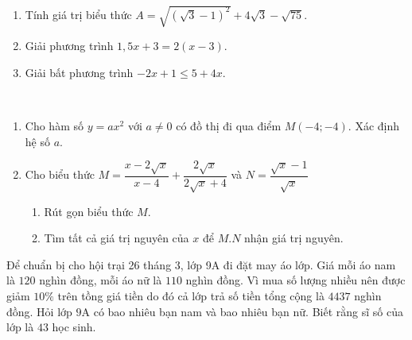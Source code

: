 \setcounter{deso}{2}
\begin{name}
	{\tenchude}
	{\tendethi}
	{\tentruong}
	{\thoigian}
\end{name}
\begin{bt}[1,5 điểm]~
\begin{enumerate}[1.]
    \item Tính giá trị biểu thức $A=\sqrt{(\sqrt{3}-1)^2}+4\sqrt{3}-\sqrt{75}$.
    \item Giải phương trình $1,5x+3=2(x-3)$.
    \item Giải bất phương trình $-2x+1 \le 5+4x$.
\end{enumerate}
\end{bt}

\begin{bt}[2,0 điểm]~
\begin{enumerate}[1.]
    \item Cho hàm số $y=ax^2$ với $a \ne 0$ có đồ thị đi qua điểm $M(-4;-4)$. Xác định hệ số $a$.
    \item Cho biểu thức $M=\dfrac{x-2\sqrt{x}}{x-4}+\dfrac{2\sqrt{x}}{2\sqrt{x}+4}$ và $N=\dfrac{\sqrt{x}-1}{\sqrt{x}}$
    \begin{enumerate}
        \item Rút gọn biểu thức $M$.
        \item Tìm tất cả giá trị nguyên của $x$ để $M.N$ nhận giá trị nguyên.
    \end{enumerate}
\end{enumerate}
\end{bt}

\begin{bt}[1,5 điểm]%
Để chuẩn bị cho hội trại 26 tháng 3, lớp 9A đi đặt may áo lớp. Giá mỗi áo nam là $120$ nghìn đồng,
mỗi áo nữ là $110$ nghìn đồng. Vì mua số lượng nhiều nên được giảm $10 \%$ trên tồng giá tiền do đó cả lớp trả số tiền tổng cộng là $4437$ nghìn đồng. Hỏi lớp $9$A có bao nhiêu bạn nam và bao nhiêu bạn nữ. Biết rằng sĩ số của lớp là $43$ học sinh.
\end{bt}

